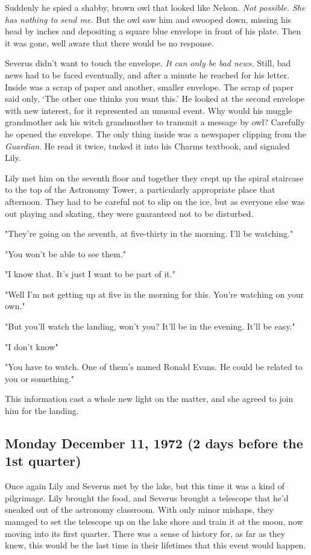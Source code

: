 Suddenly he spied a shabby, brown owl that looked like Nelson. \emph{Not possible. She has nothing to send me.} But the owl saw him and swooped down, missing his head by inches and depositing a square blue envelope in front of his plate. Then it was gone, well aware that there would be no response.

Severus didn't want to touch the envelope. \emph{It can only be bad news.} Still, bad news had to be faced eventually, and after a minute he reached for his letter. Inside was a scrap of paper and another, smaller envelope. The scrap of paper said only, `The other one thinks you want this.' He looked at the second envelope with new interest, for it represented an unusual event. Why would his muggle grandmother ask his witch grandmother to transmit a message by owl? Carefully he opened the envelope. The only thing inside was a newspaper clipping from the \emph{Guardian}. He read it twice, tucked it into his Charms textbook, and signaled Lily.

Lily met him on the seventh floor and together they crept up the spiral staircase to the top of the Astronomy Tower, a particularly appropriate place that afternoon. They had to be careful not to slip on the ice, but as everyone else was out playing and skating, they were guaranteed not to be disturbed.

"They're going on the seventh, at five-thirty in the morning. I'll be watching."

"You won't be able to see them."

"I know that. It's just{\el} I want to be part of it."

"Well I'm not getting up at five in the morning for this. You're watching on your own."

"But you'll watch the landing, won't you? It'll be in the evening. It'll be easy."

"I don't know{\el}"

"You have to watch. One of them's named Ronald Evans. He could be related to you or something."

This information cast a whole new light on the matter, and she agreed to join him for the landing.

\subsection{Monday December 11, 1972 (2 days before the 1st quarter)}

Once again Lily and Severus met by the lake, but this time it was a kind of pilgrimage. Lily brought the food, and Severus brought a telescope that he'd sneaked out of the astronomy classroom. With only minor mishaps, they managed to set the telescope up on the lake shore and train it at the moon, now moving into its first quarter. There was a sense of history for, as far as they knew, this would be the last time in their lifetimes that this event would happen.


